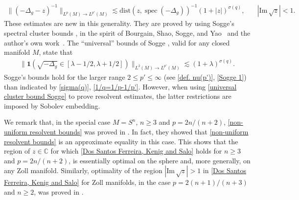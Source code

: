 \documentclass[12pt]{amsart}
\newcommand{\C}{{\mathbb C}}
\newcommand{\dist}{\mathrm{dist}}
\newcommand\im{\mathrm{Im}\,}
\DeclareMathOperator{\spec}{spec}
\begin{document}
\begin{align}\label{non-uniform resolvent bounds}
  \|(-\Delta_g-z)^{-1}\|_{L^{p}(M)\to L^{p'}(M)}\lesssim\dist(z,\spec(-\Delta_g))^{-1}(1+ |z|)^{\sigma(q)},\quad &|\im\sqrt{z}|< 1.
\end{align}
These estimates are new in this generality. They are proved by using Sogge's spectral cluster bounds \cite{MR930395}, in the spirit of Bourgain, Shao, Sogge, and Yao~\cite{MR3302640} and the author's own work~\cite{MR4664427}. The “universal” bounds of Sogge \cite{MR930395}, valid for any closed manifold $M$, state that
\begin{align}\label{universal cluster bound Sogge}
    \|\mathbf{1}(\sqrt{-\Delta_g}\in [\lambda-1/2,\lambda+1/2])\|_{L^{2}(M)\to L^{p'}(M)}\lesssim(1+\lambda)^{\sigma(q)}.
\end{align}
Sogge's bounds hold for the larger range $2\leq p'\leq \infty$ (see \eqref{def. nu(p')}, \eqref{Sogge 1}) than indicated by \eqref{sigma(q)}, \eqref{1/q=1/p-1/p'}. However, when using \eqref{universal cluster bound Sogge} to prove resolvent estimates, the latter restrictions are imposed by Sobolev embedding.


We remark that, in the special case $M=S^n$, $n\geq 3$ and $p=2n/(n+2)$, \eqref{non-uniform resolvent bounds} was proved in \cite[Theorem 1.1]{MR3302640}.
In fact, they showed that \eqref{non-uniform resolvent bounds} is an approximate equality in this case. This shows that the region of $z\in\C$ for which \eqref{Dos Santos Ferreira, Kenig and Salo} holds for $n\geq 3$ and $p=2n/(n+2)$, is essentially optimal on the sphere and, more generally, on any Zoll manifold.
Similarly, optimality of the region $|\im\sqrt{z}|>1$ in \eqref{Dos Santos Ferreira, Kenig and Salo} for Zoll manifolds, in the case $p=2(n+1)/(n+3)$ and $n\geq 2$, was proved in \cite{MR3620715}. 
\end{document}
